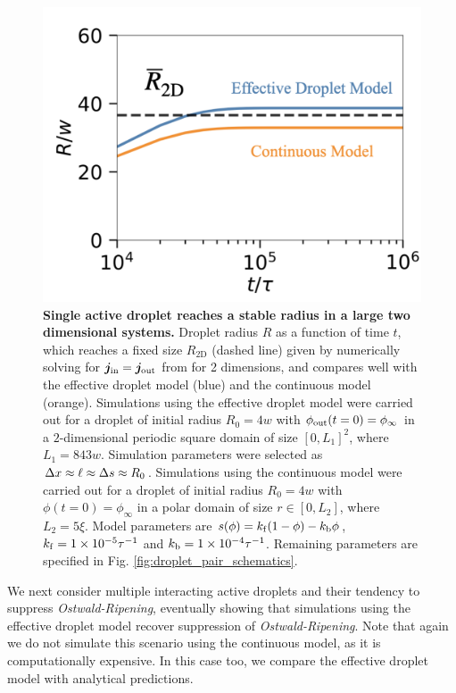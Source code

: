 \begin{figure}[tb]
\centering
\includegraphics[scale=0.3]{MainContent/Figures/active_droplet_2D_infinite.pdf}
\caption{\textbf{Single active droplet reaches a stable radius in a large two dimensional systems.}
Droplet radius $R$ as a function of time $t$, which reaches a fixed size $R_\mathrm{2D}$ (dashed line) given by numerically solving for $\boldsymbol{j}_\mathrm{in} = \boldsymbol{j}_\mathrm{out}$ from  for 2 dimensions, and compares well with the effective droplet model (blue) and the continuous model (orange).
Simulations using the effective droplet model were carried out for a droplet of initial radius $R_0 = 4 w$ with $\phi_\mathrm{out}(t=0) = \phi_\infty$ in a $2$-dimensional periodic square domain of size $[0, L_1]^2$, where $L_1 = 843 w$.
Simulation parameters were selected as $\Delta x \approx \ell \approx \Delta s \approx R_0$.
Simulations using the continuous model were carried out for a droplet of initial radius $R_0 = 4 w$ with $\phi(t=0) = \phi_\infty$ in a polar domain of size $r \in [0, L_2]$, where $L_2 = 5 \xi$.
Model parameters are $s(\phi)= k_\mathrm{f} (1 - \phi) - k_\mathrm{b} \phi$, $k_\mathrm{f} = 1 \times 10^{-5} \tau^{-1}$ and $k_\mathrm{b} = 1 \times 10^{-4}  \tau^{-1}$.
Remaining parameters are specified in Fig. \ref{fig:droplet_pair_schematics}.
}
\label{fig:active_droplet_2D_infinite}
\end{figure}

We next consider multiple interacting active droplets and their tendency to suppress \textit{Ostwald-Ripening}, eventually showing that simulations using the effective droplet model recover suppression of \textit{Ostwald-Ripening}.
Note that again we do not simulate this scenario using the continuous model, as it is computationally expensive. 
In this case too, we compare the effective droplet model with analytical predictions. 

